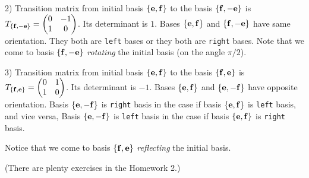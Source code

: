 \documentclass[12pt]{article}
\numberwithin{equation}{section}
\begin{document}
\smallskip


2)  Transition matrix from initial basis $\{{\bf e},{\bf f}\}$ to the
basis $\{{\bf f},-{\bf e}\}$ is $T_{\{{\bf f},-{\bf e}\}}=
   \begin{pmatrix} 0&-1\cr 1&0\cr\end{pmatrix}$. Its determinant is $1$.
   Bases $\{{\bf e},{\bf f}\}$ and $\{{\bf f},-{\bf e}\}$ have same orientation.
They both are {\tt left} bases or they both are {\tt right} 
bases.
Note that we come to basis $\{{\bf f},-{\bf e}\}$ {\it rotating}
  the initial basis (on the angle $\pi/2$).

\smallskip

3) Transition matrix from initial basis $\{{\bf e},{\bf f}\}$ to the
basis $\{{\bf f},{\bf e}\}$ is $T_{\{{\bf f},{\bf e}\}}=
   \begin{pmatrix} 0&1\cr 1&0\cr\end{pmatrix}$. Its determinant is $-1$.
   Bases $\{{\bf e},{\bf f}\}$ and $\{{\bf e},-{\bf f}\}$ have opposite orientation.
     Basis $\{{\bf e},-{\bf f}\}$ is {\tt right} basis in the case if
     basis $\{{\bf e},{\bf f}\}$ is {\tt left} basis, and vice versa,
      Basis $\{{\bf e},-{\bf f}\}$ is {\tt left} basis in the case if
     basis $\{{\bf e},{\bf f}\}$ is {\tt right} basis.

 Notice that we come to basis $\{{\bf f},{\bf e}\}$ 
{\it reflecting} the initial basis.

\smallskip


(There are plenty exercises in the Homework 2.)



\bigskip
\end{document}
